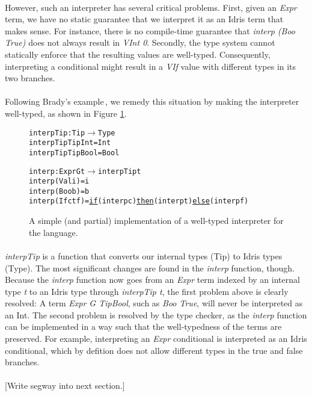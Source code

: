 \paragraph{}
However, such an interpreter has several critical problems. First, given an \textit{Expr} term, we have no static guarantee that we interpret it as an Idris term that makes sense. For instance, there is no compile-time guarantee that \textit{interp (Boo True)} does not always result in \textit{VInt 0}. Secondly, the type system cannot statically enforce that the resulting values are well-typed. Consequently, interpreting a conditional might result in a \textit{VIf} value with different types in its two branches.

\paragraph{}
Following Brady's example\,\cite{Brady:IdrisTutorial}, we remedy this situation by making the interpreter well-typed, as shown in Figure \ref{fig:well-typed-interpreter-impl}.

\begin{figure}
\begin{alltt}
interpTip : Tip \(\rightarrow\) Type
interpTip TipInt  = Int
interpTip TipBool = Bool

interp : Expr G t \(\rightarrow\) interpTip t
interp (Val i) = i
interp (Boo b) = b
interp (If c t f) = \underline{if} (interp c) \underline{then} (interp t) \underline{else} (interp f)
\end{alltt}
\caption{A simple (and partial) implementation of a well-typed interpreter for the language.}
\label{fig:well-typed-interpreter-impl}
\end{figure}

\paragraph{}
\textit{interpTip} is a function that converts our internal types (Tip) to Idris types (Type). The most significant changes are found in the \textit{interp} function, though. Because the \textit{interp} function now goes from an \textit{Expr} term indexed by an internal type \textit{t} to an Idris type through \textit{interpTip t}, the first problem above is clearly resolved: A term \textit{Expr G TipBool}, such as \textit{Boo True}, will never be interpreted as an Int. The second problem is resolved by the type checker, as the \textit{interp} function can be implemented in a way such that the well-typedness of the terms are preserved. For example, interpreting an \textit{Expr} conditional is interpreted as an Idris conditional, which by defition does not allow different types in the true and false branches.

\paragraph{}
[Write segway into next section.]

